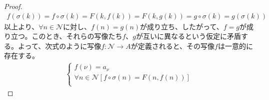 \documentclass[dvipdfmx]{jsarticle}
\begin{document}
\begin{proof}
\begin{align*}
f\left( \sigma(k) \right) = f \circ \sigma(k) = F\left( k,f(k) \right) = F\left( k,g(k) \right) = g \circ \sigma(k) = g\left( \sigma(k) \right)
\end{align*}
以上より、$\forall n \in \mathcal{N}$に対し、$f(n) = g(n)$が成り立ち、したがって、$f = g$が成り立つ。このとき、それらの写像たち$f$、$g$が互いに異なるという仮定に矛盾する。よって、次式のように写像$f:\mathcal{N \rightarrow}A$が定義されると、その写像$f$は一意的に存在する。
\begin{align*}
\left\{ \begin{matrix}
f(\nu) = a_{\nu} \\
\forall n \in \mathcal{N}\left[ f \circ \sigma(n) = F\left( n,f(n) \right) \right] \\
\end{matrix} \right.\ 
\end{align*}
\end{proof}
\end{document}
